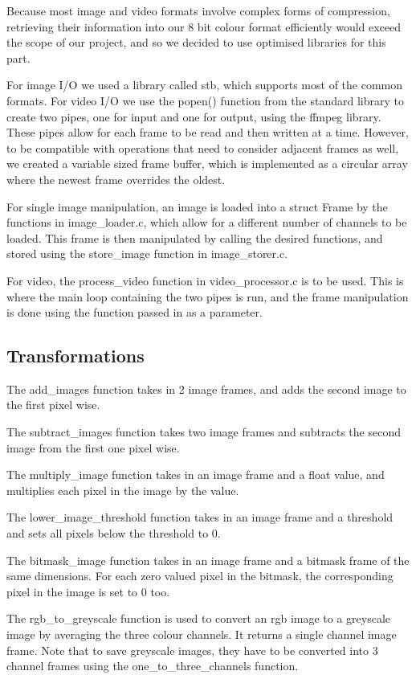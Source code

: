 \documentclass[11pt]{article}
\begin{document}
Because most image and video formats involve complex forms of compression, retrieving their information into our 8 bit colour format efficiently would exceed the scope of our project, and so we decided to use optimised libraries for this part.

For image I/O we used a library called stb, which supports most of the common formats. For video I/O we use the popen() function from the standard library to create two pipes, one for input and one for output, using the ffmpeg library. These pipes allow for each frame to be read and then written at a time. However, to be compatible with operations that need to consider adjacent frames as well, we created a variable sized frame buffer, which is implemented as a circular array where the newest frame overrides the oldest.

For single image manipulation, an image is loaded into a struct Frame by the functions in image\_loader.c, which allow for a different number of channels to be loaded. This frame is then manipulated by calling the desired functions, and stored using the store\_image function in image\_storer.c.

For video, the process\_video function in video\_processor.c is to be used. This is where the main loop containing the two pipes is run, and the frame manipulation is done using the function passed in as a parameter.

  \subsection*{Transformations}
The add\_images function takes in 2 image frames, and adds the second image to the first pixel wise.

The subtract\_images function takes two image frames and subtracts the second image from the first one pixel wise.

The multiply\_image function takes in an image frame and a float value, and multiplies each pixel in the image by the value.

The lower\_image\_threshold function takes in an image frame and a threshold and sets all pixels below the threshold to 0.

The bitmask\_image function takes in an image frame and a bitmask frame of the same dimensions. For each zero valued pixel in the bitmask, the corresponding pixel in the image is set to 0 too.

The rgb\_to\_greyscale function is used to convert an rgb image to a greyscale image by averaging the three colour channels. It returns a single channel image frame. Note that to save greyscale images, they have to be converted into 3 channel frames using the  one\_to\_three\_channels function.
\end{document}

